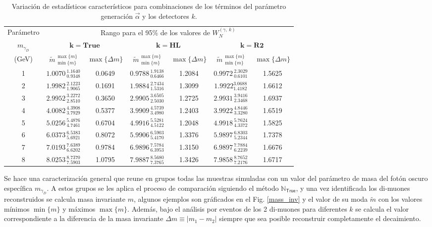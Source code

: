 \begin{table}[!t]
\centering
\footnotesize%
\begin{tabular}{|c|cccccc|}
\toprule
Parámetro& \multicolumn{6}{c|}{Rango para el 95\% de los valores de $W_N^{(\gamma, ~ k)}$ }\\
$m_{\gamma_D}$ & \multicolumn{2}{c}{$\mathbf{k = True}$} & \multicolumn{2}{c}{$\mathbf{k = HL}$} & \multicolumn{2}{c|}{$\mathbf{k = R2}$}\\
(GeV)
& $\widetilde{m}^{~\max{\{m\}}}_{~\min{\{m\}}}$ & $\max{\{\Delta m\}}$
& $\widetilde{m}^{~\max{\{m\}}}_{~\min{\{m\}}}$ & $\max{\{\Delta m\}}$ 
& $\widetilde{m}^{~\max{\{m\}}}_{~\min{\{m\}}}$ & $\max{\{\Delta m\}}$ \\
\midrule
1 & $1.0070^{~1.1640}_{~0.9348}$ & 0.0649 & $0.9788^{~1.9138}_{~0.6466}$ & 1.2084 & $0.9972^{~2.3029}_{~0.6101}$ & 1.5625 \\ \midrule
2 & $1.9982^{~2.1223}_{~1.9065}$ & 0.1691 & $1.9884^{~2.7434}_{~1.5316}$ & 1.3099 & $1.9922^{3.0688}_{1.4182}$ & 1.6612\\ \midrule
3 & $2.9952^{~3.2272}_{~2.8510}$ & 0.3650 & $2.9905^{~3.6505}_{~2.5030}$ & 1.2725 & $2.9931^{~3.9416}_{~2.3468}$ & 1.6937\\ \midrule
4 & $4.0082^{~4.3908}_{~3.7929}$ & 0.5377 & $3.9909^{~4.5739}_{~3.4980}$ & 1.2403 & $3.9922^{~4.8446}_{~3.3280}$ & 1.6519\\ \midrule
5 & $5.0256^{~5.4876}_{~4.7461}$ & 0.6704 & $4.9916^{~5.5281}_{~4.5122}$ & 1.2048 & $4.9918^{~5.7624}_{~4.3372}$ & 1.5825 \\ \midrule
6 & $6.0373^{~6.5383}_{~5.6921}$ & 0.8072 & $5.9906^{~6.5903}_{~5.4170}$ & 1.3376 & $5.9897^{~6.8303}_{~5.2344}$ & 1.7378\\ \midrule
7 & $7.0193^{~7.6389}_{~6.6202}$ & 0.9784 & $6.9896^{~7.5784}_{~6.3953}$ & 1.3150 & $6.9897^{~7.7884}_{~6.2239}$ & 1.6676\\ \midrule
8 & $8.0253^{~8.7370}_{~7.5903}$ & 1.0795 & $7.9887^{~8.5680}_{~7.3765}$ & 1.3426 & $7.9858^{~8.7652}_{~7.2176}$ & 1.6717\\
\bottomrule 
\end{tabular}
\caption{Variación de estadísticos característicos para combinaciones de los términos del parámetro generación $\vec{\alpha}$ y los detectores $k$.}
\label{mass0}
\end{table}

Se hace una caracterización general que reune en grupos todas las muestras simuladas con un valor del parámetro de masa del fotón oscuro específica $m_{\gamma_D}$. A estos grupos se les aplica el proceso de comparación siguiendo el método $\mathbb{N}_\textsf{True}$, y una vez identificada los di-muones reconstruidos se calcula masa invariante $m$, algunos ejemplos son gráficados en el Fig. \ref{mass_inv} y el valor de su moda $\widetilde{m}$ con los valores mínimos $\min{\{m\}}$ y máximos $\max{\{m\}}$. Además, bajo el análisis por eventos de los 2 di-muones para diferentes $k$ se calcula el valor correspondiente a la diferencia de la masa invariante $\Delta m\equiv|m_1-m_2|$ siempre que sea posible reconstruir completamente el decaimiento.

